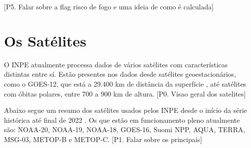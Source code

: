 \documentclass[cic,tc]{iiufrgs}
\begin{document}
[P5. Falar sobre a flag risco de fogo e uma ideia de como é calculada] \par

\section{Os Satélites}

O INPE atualmente processa dados de vários satélites com características
distintas entre sí. Estão presentes nos dados desde satélites geoestacionários, 
como o GOES-12, que está a 29.400 km de distância da superfície 
\citep{GOES12Algo}, até satélites com óbitas polares, entre 700 a 900 km de altura.
[P0. Visao geral dos satelites] \par

Abaixo segue um resumo dos satélites usados pelos INPE desde o início da 
série histórica até final de 2022 \cite{EmbrapaSatelites}. 
Os que estão em funcionamento pleno atualmente são:
NOAA-20, NOAA-19, NOAA-18, GOES-16, Suomi NPP, AQUA, TERRA, MSG-03, 
METOP-B e METOP-C. [P1. Falar sobre os principais]\par
\end{document}
